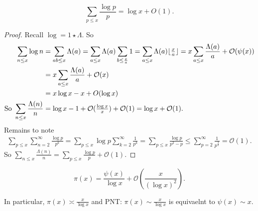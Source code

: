 \documentclass{article}
\newcommand{\bigO}{\mathcal{O}}
\DeclarePairedDelimiter\floor{\lfloor}{\rfloor}
\begin{document}
\begin{nlemma}\label{lem:7}
  \begin{equation*}
    \sum_{p \leq x} \frac{\log p}{p} = \log x + O(1).
  \end{equation*}
\end{nlemma}
\begin{proof}
  Recall $\log = 1 \star \Lambda$. So
  \begin{align*}
    \sum_{n \leq x} \log n &= \sum_{ab \leq x} \Lambda(a) = \sum_{a \leq x} \Lambda(a) \sum_{b \leq \frac{x}{a}} 1 = \sum_{a \leq x} \Lambda(a) \floor{\tfrac{x}{a}} = x \sum_{a \leq x} \frac{\Lambda(a)}{a} + \bigO(\psi(x)) \\
&= x \sum_{a \leq x} \frac{\Lambda(a)}{a} + \bigO(x) \\
&= x \log x - x + O(\log x) \\
    \text{So }\sum_{n \leq x} \frac{\Lambda(n)}{n} &= \log x - 1 + \mathcal{O}(\tfrac{\log x}{x}) + \bigO(1) = \log x + \bigO(1).
  \end{align*}
  Remains to note
  \begin{align*}
    \sum_{p \leq x} \sum_{n=2}^\infty \frac{\log p}{p^k} = \sum_{p \leq x} \log p \sum_{k=2}^\infty \frac{1}{p^k} = \sum_{p \leq x} \frac{\log p}{p^2 - p} \leq \sum_{p=2}^\infty \frac{1}{p^{\frac{3}{2}}} = \bigO(1).
  \end{align*}
  So  $\sum_{n \leq x} \frac{\Lambda(n)}n = \sum_{p \leq x} \frac{\log p}{p} + \bigO(1)$.
\end{proof}
\begin{nlemma}\label{lem:8}
  \begin{equation*}
    \pi(x) = \frac{\psi(x)}{\log x} + \bigO\left(\frac{x}{(\log x)^2}\right).
  \end{equation*}
\end{nlemma}
In particular, $\pi(x) \asymp \frac{x}{\log x}$ and PNT: $\pi(x) \sim \frac{x}{\log x}$ is equivaelnt to $\psi(x) \sim x$.
\end{document}
